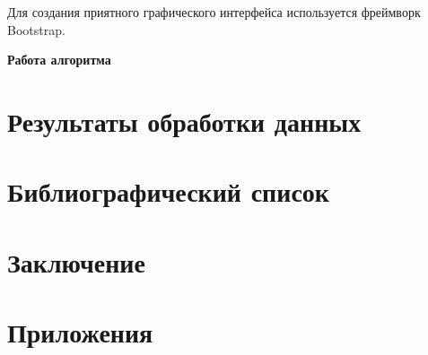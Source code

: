 \documentclass[a4paper,14pt]{article}
\begin{document}
	Для создания приятного графического интерфейса используется фреймворк Bootstrap.
	
\textbf{Работа алгоритма}
	
	


\section{Результаты обработки данных}



\section{Библиографический список}

\section{Заключение}

\section{Приложения}
\end{document}
